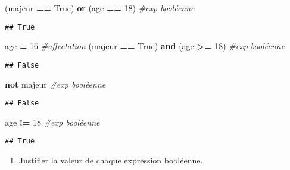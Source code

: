 \documentclass[
]{book}
\newenvironment{Shaded}{\begin{snugshade}}{\end{snugshade}}
\newcommand{\CommentTok}[1]{\textcolor[rgb]{0.56,0.35,0.01}{\textit{#1}}}
\newcommand{\DecValTok}[1]{\textcolor[rgb]{0.00,0.00,0.81}{#1}}
\newcommand{\KeywordTok}[1]{\textcolor[rgb]{0.13,0.29,0.53}{\textbf{#1}}}
\newcommand{\NormalTok}[1]{#1}
\newcommand{\OperatorTok}[1]{\textcolor[rgb]{0.81,0.36,0.00}{\textbf{#1}}}
\newcommand{\VariableTok}[1]{\textcolor[rgb]{0.00,0.00,0.00}{#1}}
\providecommand{\tightlist}{%
  \setlength{\itemsep}{0pt}\setlength{\parskip}{0pt}}
\def\tightlist{}
\begin{document}
\begin{Shaded}
\begin{Highlighting}[]
\NormalTok{(majeur }\OperatorTok{==} \VariableTok{True}\NormalTok{) }\KeywordTok{or}\NormalTok{ (age }\OperatorTok{==} \DecValTok{18}\NormalTok{) }\CommentTok{\#exp booléenne}
\end{Highlighting}
\end{Shaded}

\begin{verbatim}
## True
\end{verbatim}

\begin{Shaded}
\begin{Highlighting}[]
\NormalTok{age }\OperatorTok{=} \DecValTok{16} \CommentTok{\#affectation}
\NormalTok{(majeur }\OperatorTok{==} \VariableTok{True}\NormalTok{) }\KeywordTok{and}\NormalTok{ (age }\OperatorTok{\textgreater{}=} \DecValTok{18}\NormalTok{) }\CommentTok{\#exp booléenne}
\end{Highlighting}
\end{Shaded}

\begin{verbatim}
## False
\end{verbatim}

\begin{Shaded}
\begin{Highlighting}[]
\KeywordTok{not}\NormalTok{ majeur }\CommentTok{\#exp booléenne}
\end{Highlighting}
\end{Shaded}

\begin{verbatim}
## False
\end{verbatim}

\begin{Shaded}
\begin{Highlighting}[]
\NormalTok{age }\OperatorTok{!=} \DecValTok{18} \CommentTok{\#exp booléenne}
\end{Highlighting}
\end{Shaded}

\begin{verbatim}
## True
\end{verbatim}

\begin{enumerate}
\def\labelenumi{\arabic{enumi}.}
\setcounter{enumi}{1}
\tightlist
\item
  Justifier la valeur de chaque expression booléenne.
\end{enumerate}
\end{document}
